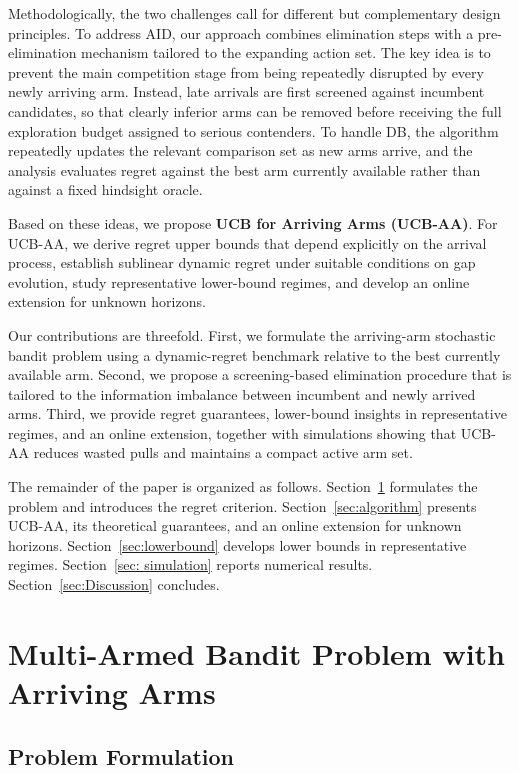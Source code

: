 \documentclass[11pt]{article}
\begin{document}
Methodologically, the two challenges call for different but complementary design principles. To address AID, our approach combines elimination steps \parencite{EvenDar2006SE,Auer2010UCBRI,PerchetRigollet2013,QianYang2016} with a pre-elimination mechanism tailored to the expanding action set. The key idea is to prevent the main competition stage from being repeatedly disrupted by every newly arriving arm. Instead, late arrivals are first screened against incumbent candidates, so that clearly inferior arms can be removed before receiving the full exploration budget assigned to serious contenders. To handle DB, the algorithm repeatedly updates the relevant comparison set as new arms arrive, and the analysis evaluates regret against the best arm currently available rather than against a fixed hindsight oracle. 

Based on these ideas, we propose \textbf{UCB for Arriving Arms (UCB-AA)}. For UCB-AA, we derive regret upper bounds that depend explicitly on the arrival process, establish sublinear dynamic regret under suitable conditions on gap evolution, study representative lower-bound regimes, and develop an online extension for unknown horizons.

Our contributions are threefold. First, we formulate the arriving-arm stochastic bandit problem using a dynamic-regret benchmark relative to the best currently available arm. Second, we propose a screening-based elimination procedure that is tailored to the information imbalance between incumbent and newly arrived arms. Third, we provide regret guarantees, lower-bound insights in representative regimes, and an online extension, together with simulations showing that UCB-AA reduces wasted pulls and maintains a compact active arm set.

The remainder of the paper is organized as follows. Section~\ref{sec:problem} formulates the problem and introduces the regret criterion. Section~\ref{sec:algorithm} presents UCB-AA, its theoretical guarantees, and an online extension for unknown horizons. Section~\ref{sec:lowerbound} develops lower bounds in representative regimes. Section~\ref{sec: simulation} reports numerical results. Section~\ref{sec:Discussion} concludes.

\section{Multi-Armed Bandit Problem with Arriving Arms }
\label{sec:problem}


\subsection{Problem Formulation}
\end{document}

